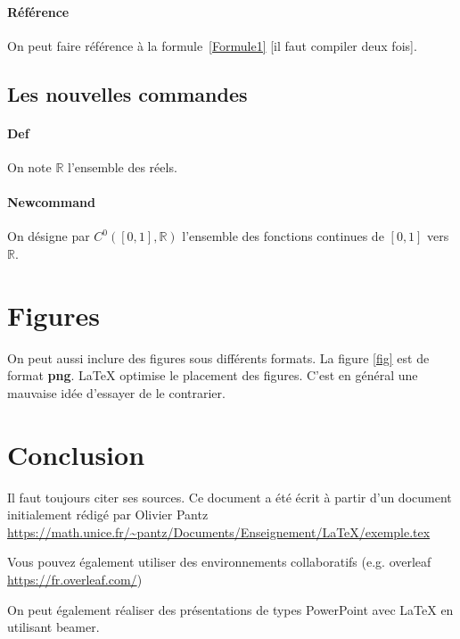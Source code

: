 \documentclass{article}
\def \R {\mathbb R}					%
\newcommand \fonctionsContinues[2] {C^0(#1,#2)}		%
\begin{document}
\paragraph{Référence} 
On peut faire référence \`a la formule~\eqref{Formule1} [il faut compiler deux fois].

\subsection{Les nouvelles commandes}

\paragraph{Def} On note $\R$ l'ensemble des réels.
\paragraph{Newcommand} On désigne par $\fonctionsContinues{[0,1]}{\R}$ l'ensemble des fonctions continues de $[0,1]$ vers $\R$.

\section{Figures}
On peut aussi inclure des figures sous différents formats. La figure \ref{fig} est de format \textbf{png}.
{\LaTeX} optimise le placement des figures. C'est en général une mauvaise idée d'essayer de le contrarier.

\section{Conclusion}

Il faut toujours citer ses sources. Ce document a été écrit à partir d'un document initialement rédigé par Olivier Pantz \url{https://math.unice.fr/~pantz/Documents/Enseignement/LaTeX/exemple.tex}

Vous pouvez également utiliser des environnements collaboratifs (e.g. overleaf \url{https://fr.overleaf.com/}) 

On peut également réaliser des présentations de types PowerPoint avec {\LaTeX} en utilisant beamer.
\end{document}
